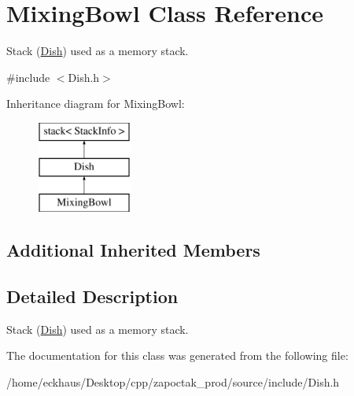 \hypertarget{classMixingBowl}{\section{Mixing\-Bowl Class Reference}
\label{classMixingBowl}
}


Stack (\hyperlink{classDish}{Dish}) used as a memory stack.  




{\ttfamily \#include $<$Dish.\-h$>$}

Inheritance diagram for Mixing\-Bowl\-:\begin{figure}[H]
\begin{center}
\leavevmode
\includegraphics[height=3.000000cm]{classMixingBowl}
\end{center}
\end{figure}
\subsection*{Additional Inherited Members}


\subsection{Detailed Description}
Stack (\hyperlink{classDish}{Dish}) used as a memory stack. 

The documentation for this class was generated from the following file\-:\begin{DoxyCompactItemize}
\item 
/home/eckhaus/\-Desktop/cpp/zapoctak\-\_\-prod/source/include/Dish.\-h\end{DoxyCompactItemize}

